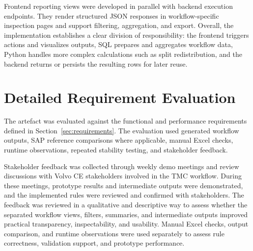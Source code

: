 Frontend reporting views were developed in parallel with backend execution endpoints. They render structured JSON responses in workflow-specific inspection pages and support filtering, aggregation, and export. Overall, the implementation establishes a clear division of responsibility: the frontend triggers actions and visualizes outputs, SQL prepares and aggregates workflow data, Python handles more complex calculations such as split redistribution, and the backend returns or persists the resulting rows for later reuse.

\section{Detailed Requirement Evaluation}

The artefact was evaluated against the functional and performance requirements defined in Section~\ref{sec:requirements}. The evaluation used generated workflow outputs, SAP reference comparisons where applicable, manual Excel checks, runtime observations, repeated stability testing, and stakeholder feedback.

Stakeholder feedback was collected through weekly demo meetings and review discussions with Volvo CE stakeholders involved in the TMC workflow. During these meetings, prototype results and intermediate outputs were demonstrated, and the implemented rules were reviewed and confirmed with stakeholders. The feedback was reviewed in a qualitative and descriptive way to assess whether the separated workflow views, filters, summaries, and intermediate outputs improved practical transparency, inspectability, and usability. Manual Excel checks, output comparison, and runtime observations were used separately to assess rule correctness, validation support, and prototype performance.

